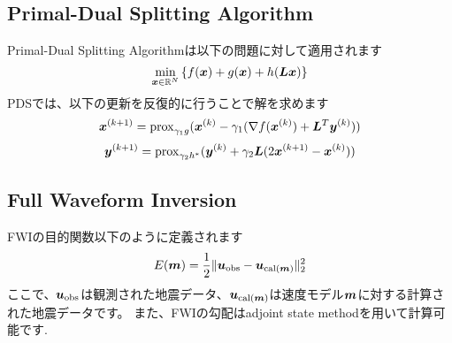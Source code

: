 \subsection{Primal-Dual Splitting Algorithm}\label{subsec:primal-dual-splitting-algorithm}
Primal-Dual Splitting Algorithm\cite{PDS}は以下の問題に対して適用されます
\begin{equation} \label{eq:PDSPrimalEq} \underset{ \bm{x} \in \mathbb{R}^N }{\mathrm{min}} \left\{ f(\bm{x}) + g(\bm{x}) + h(\bm{L} \bm{x}) \right\} \notag \end{equation}
PDSでは、以下の更新を反復的に行うことで解を求めます
\begin{equation} \label{eq:PDSSubStepX} \bm{x}^{(k+1)} = \mathrm{prox}_{\gamma_1 g}(\bm{x}^{(k)} - \gamma_1( \nabla f(\bm{x}^{(k)}) + \bm{L}^T \bm{y}^{(k)} )) \notag \end{equation}
\begin{equation} \label{eq:PDSSubStepY} \bm{y}^{(k+1)} = \mathrm{prox}_{\gamma_2 h^*}(\bm{y}^{(k)} + \gamma_2 \bm{L} (2\bm{x}^{(k+1)} - \bm{x}^{(k)}) ) \notag \end{equation}

\subsection{Full Waveform Inversion}\label{subsec:full-waveform-inversion}

FWIの目的関数以下のように定義されます
\begin{equation} \label{eq:FWIObjective} E(\bm{m}) = \frac {1} {2} \lVert  \bm{u}_{\mathrm{obs}} - \bm{u}_{\mathrm{cal}(\bm{m})}  \rVert _2^2 \end{equation}
ここで、$\bm{u}_{\mathrm{obs}}$は観測された地震データ、$\bm{u}_{\mathrm{cal}(\bm{m})}$は速度モデル$\bm{m}$に対する計算された地震データです。
また、FWIの勾配はadjoint state methodを用いて計算可能です\cite{FWI-gradient}.

